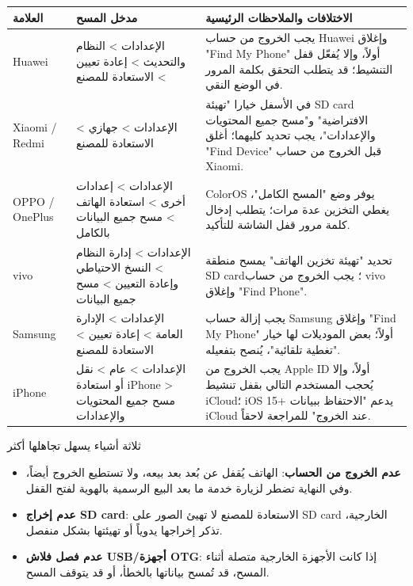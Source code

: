 \begin{center}
\begin{tabularx}{\linewidth}{|X|X|X|}
\hline
\textbf{العلامة} & \textbf{مدخل المسح} & \textbf{الاختلافات والملاحظات الرئيسية} \tabularnewline
\hline
Huawei & الإعدادات > النظام والتحديث > إعادة تعيين > الاستعادة للمصنع & يجب الخروج من حساب Huawei وإغلاق "Find My Phone" أولاً، وإلا يُفعّل قفل التنشيط؛ قد يتطلب التحقق بكلمة المرور في الوضع النقي. \tabularnewline
Xiaomi / Redmi & الإعدادات > جهازي > الاستعادة للمصنع & في الأسفل خيارا "تهيئة SD card الافتراضية" و"مسح جميع المحتويات والإعدادات"، يجب تحديد كليهما؛ أغلق "Find Device" قبل الخروج من حساب Xiaomi. \tabularnewline
OPPO / OnePlus & الإعدادات > إعدادات أخرى > استعادة الهاتف > مسح جميع البيانات بالكامل & ColorOS يوفر وضع "المسح الكامل"، يغطي التخزين عدة مرات؛ يتطلب إدخال كلمة مرور قفل الشاشة للتأكيد. \tabularnewline
vivo & الإعدادات > إدارة النظام > النسخ الاحتياطي وإعادة التعيين > مسح جميع البيانات & تحديد "تهيئة تخزين الهاتف" يمسح منطقة SD card؛ يجب الخروج من حساب vivo وإغلاق "Find Phone". \tabularnewline
Samsung & الإعدادات > الإدارة العامة > إعادة تعيين > الاستعادة للمصنع & يجب إزالة حساب Samsung وإغلاق "Find My Phone" أولاً؛ بعض الموديلات لها خيار "تغطية تلقائية"، يُنصح بتفعيله. \tabularnewline
iPhone & الإعدادات > عام > نقل أو استعادة iPhone > مسح جميع المحتويات والإعدادات & يجب الخروج من Apple ID أولاً، وإلا يُحجب المستخدم التالي بقفل تنشيط iCloud؛ iOS 15+ يدعم "الاحتفاظ ببيانات iCloud عند الخروج" للمراجعة لاحقاً. \tabularnewline
\hline
\end{tabularx}
\end{center}

\begin{tcbwarn}{ثلاثة أشياء يسهل تجاهلها أكثر}
\begin{itemize}
  \item \textbf{عدم الخروج من الحساب}: الهاتف يُقفل عن بُعد بعد بيعه، ولا تستطيع الخروج أيضاً، وفي النهاية تضطر لزيارة خدمة ما بعد البيع الرسمية بالهوية لفتح القفل.
  \item \textbf{عدم إخراج SD card}: الاستعادة للمصنع لا تهيئ الصور على SD card الخارجية، تذكر إخراجها يدوياً أو تهيئتها بشكل منفصل.
  \item \textbf{عدم فصل فلاش USB/أجهزة OTG}: إذا كانت الأجهزة الخارجية متصلة أثناء المسح، قد تُمسح بياناتها بالخطأ، أو قد يتوقف المسح.
\end{itemize}

\end{tcbwarn}


